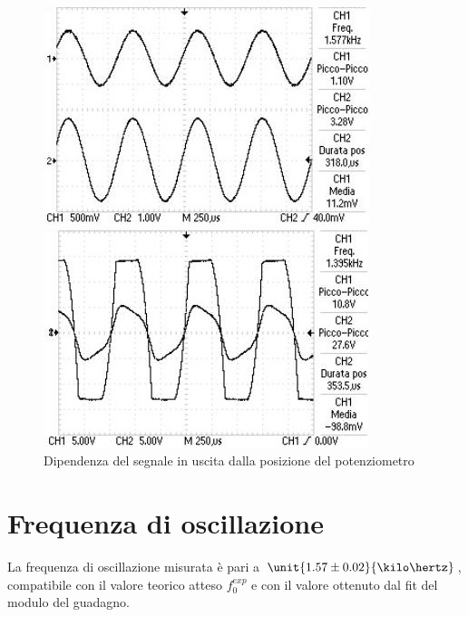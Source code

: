 \documentclass[10pt,a4paper]{article}
\begin{document}
\begin{figure}[H]
    \centering
    \begin{minipage}{0.49\textwidth}
	    \includegraphics[width=\textwidth]{../oscilloscopio/punto2.jpg}
    \end{minipage}
    \begin{minipage}{0.49\textwidth}
        \includegraphics[width=\textwidth]{../oscilloscopio/punto5(scazzo).jpg}
    \end{minipage}
    \caption{Dipendenza del segnale in uscita dalla posizione del potenziometro}
    \label{fig:dippot}
\end{figure}

\section{Frequenza di oscillazione}
La frequenza di oscillazione misurata è pari a $\unit{1.57 \pm 0.02}{\kilo\hertz}$, compatibile con il valore teorico atteso $f_0^{exp}$ e con il valore ottenuto dal fit del modulo del guadagno.
\end{document}
